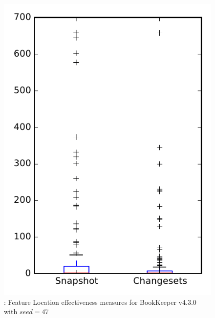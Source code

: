 
\begin{figure}
\centering
\includegraphics[height=0.4\textheight]{figures/flt_seed/rq1_bookkeeper_47}
\caption{\rone: Feature Location effectiveness measures for BookKeeper v4.3.0 with $seed=47$}
\label{fig:flt_seed:rq1:bookkeeper}
\end{figure}
